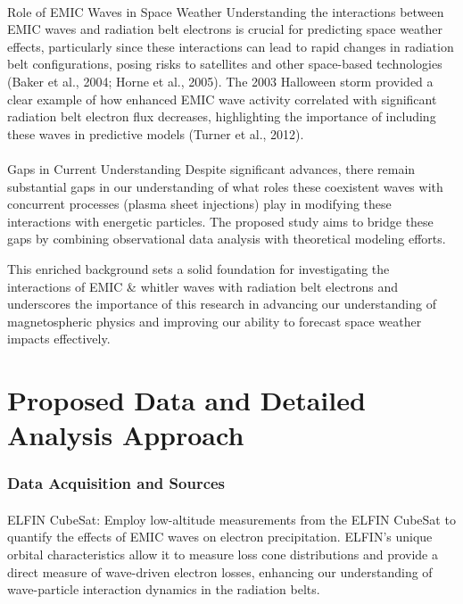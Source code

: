 \documentclass[
  letterpaper,
  DIV=11,
  numbers=noendperiod]{scrartcl}
\makeatletter
\let\oldparagraph\paragraph
\renewcommand{\paragraph}{
    \@ifstar
      \xxxParagraphStar
      \xxxParagraphNoStar
  }
\newcommand{\xxxParagraphStar}[1]{\oldparagraph*{#1}\mbox{}}
\newcommand{\xxxParagraphNoStar}[1]{\oldparagraph{#1}\mbox{}}
\makeatother
\begin{document}
\paragraph{Role of EMIC Waves in Space Weather}\label{role-of-emic-waves-in-space-weather}
Understanding the interactions between EMIC waves and radiation belt electrons is crucial for predicting space weather effects, particularly since these interactions can lead to rapid changes in radiation belt configurations, posing risks to satellites and other space-based technologies (Baker et al., 2004; Horne et al., 2005). The 2003 Halloween storm provided a clear example of how enhanced EMIC wave activity correlated with significant radiation belt electron flux decreases, highlighting the importance of including these waves in predictive models (Turner et al., 2012).

\paragraph{Gaps in Current Understanding}\label{gaps-in-current-understanding}
Despite significant advances, there remain substantial gaps in our understanding of what roles these coexistent waves with concurrent processes (plasma sheet injections) play in modifying these interactions with energetic particles. The proposed study aims to bridge these gaps by combining observational data analysis with theoretical modeling efforts.

This enriched background sets a solid foundation for investigating the interactions of EMIC \& whitler waves with radiation belt electrons and underscores the importance of this research in advancing our understanding of magnetospheric physics and improving our ability to forecast space weather impacts effectively.

\section{Proposed Data and Detailed Analysis Approach}\label{proposed-data-and-detailed-analysis-approach}

\subsubsection{Data Acquisition and Sources}\label{data-acquisition-and-sources}

\paragraph{ELFIN CubeSat:}\label{elfin-cubesat}
Employ low-altitude measurements from the ELFIN CubeSat to quantify the effects of EMIC waves on electron precipitation. ELFIN's unique orbital characteristics allow it to measure loss cone distributions and provide a direct measure of wave-driven electron losses, enhancing our understanding of wave-particle interaction dynamics in the radiation belts.
\end{document}
